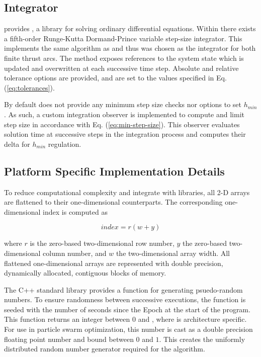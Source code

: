 \subsection{Integrator}

\noindent {} provides , a library for solving ordinary differential equations. Within 
there exists a fifth-order Runge-Kutta Dormand-Prince variable
step-size integrator. This implements the same algorithm as  and thus was chosen as the integrator for both finite
thrust arcs. The method exposes references to the system state which is updated and overwritten at each successive time step. Absolute
and relative tolerance options are provided, and are set to the values specified in Eq. (\ref{eq:tolerances}). \newline

\noindent By default  does not provide any minimum step size checks nor options to set $h_{min}$.
As such, a custom integration observer is implemented to compute and limit step size in accordance with Eq. (\ref{eq:min-step-size}). 
This observer evaluates solution time at successive steps in the integration process and computes their delta for 
$h_{min}$ regulation.

\subsection{Platform Specific Implementation Details}

\noindent To reduce computational complexity and integrate with  libraries, all 2-D arrays
are flattened to their one-dimensional counterparts. The corresponding one-dimensional index is computed as

\begin{equation}
    index = r(w+y)
    \label{eq:index-conversion}
\end{equation}

\noindent where $r$ is the zero-based two-dimensional row number, $y$ the zero-based two-dimensional column number, and $w$ the two-dimensional array width. All flattened one-dimensional arrays are represented with double precision, dynamically allocated, contiguous blocks
of memory. \newline

\noindent
The C++ standard library provides a  function for generating psuedo-random numbers.
To ensure randomness between successive executions, the  function is seeded with the number
of seconds since the Epoch at the start of the program. This function returns an integer 
between $0$ and , where  is architecture specific. 
For use in particle swarm optimization, this number is cast as a double
precision floating point number and bound between $0$ and $1$. This creates the uniformly distributed
random number generator required for the algorithm. \newline

